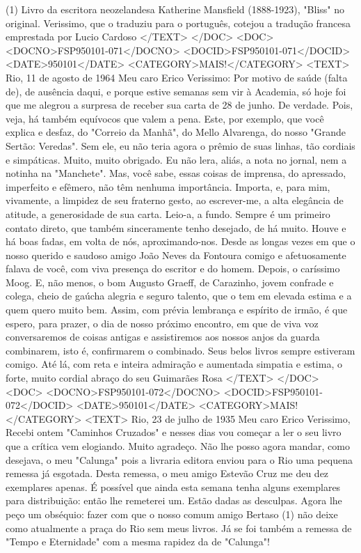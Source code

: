 (1) Livro da escritora neozelandesa Katherine Mansfield (1888-1923), "Bliss" no original. Verissimo, que o traduziu para o português, cotejou a tradução francesa emprestada por Lucio Cardoso
</TEXT>
</DOC>
<DOC>
<DOCNO>FSP950101-071</DOCNO>
<DOCID>FSP950101-071</DOCID>
<DATE>950101</DATE>
<CATEGORY>MAIS!</CATEGORY>
<TEXT>
Rio, 11 de agosto de 1964
Meu caro Erico Verissimo:
Por motivo de saúde (falta de), de ausência daqui, e porque estive semanas sem vir à Academia, só hoje foi que me alegrou a surpresa de receber sua carta de 28 de junho. De verdade. Pois, veja, há também equívocos que valem a pena. Este, por exemplo, que você explica e desfaz, do "Correio da Manhã", do Mello Alvarenga, do nosso "Grande Sertão: Veredas". Sem ele, eu não teria agora o prêmio de suas linhas, tão cordiais e simpáticas. Muito, muito obrigado.
Eu não lera, aliás, a nota no jornal, nem a notinha na "Manchete". Mas, você sabe, essas coisas de imprensa, do apressado, imperfeito e efêmero, não têm nenhuma importância. Importa, e, para mim, vivamente, a limpidez de seu fraterno gesto, ao escrever-me, a alta elegância de atitude, a generosidade de sua carta. Leio-a, a fundo.
Sempre é um primeiro contato direto, que também sinceramente tenho desejado, de há muito. Houve e há boas fadas, em volta de nós, aproximando-nos. Desde as longas vezes em que o nosso querido e saudoso amigo João Neves da Fontoura comigo e afetuosamente falava de você, com viva presença do escritor e do homem. Depois, o caríssimo Moog. E, não menos, o bom Augusto Graeff, de Carazinho, jovem confrade e colega, cheio de gaúcha alegria e seguro talento, que o tem em elevada estima e a quem quero muito bem.
Assim, com prévia lembrança e espírito de irmão, é que espero, para prazer, o dia de nosso próximo encontro, em que de viva voz conversaremos de coisas antigas e assistiremos aos nossos anjos da guarda combinarem, isto é, confirmarem o combinado. Seus belos livros sempre estiveram comigo.
Até lá, com reta e inteira admiração e aumentada simpatia e estima, o forte, muito cordial abraço do seu
Guimarães Rosa
</TEXT>
</DOC>
<DOC>
<DOCNO>FSP950101-072</DOCNO>
<DOCID>FSP950101-072</DOCID>
<DATE>950101</DATE>
<CATEGORY>MAIS!</CATEGORY>
<TEXT>
Rio, 23 de julho de 1935
Meu caro Erico Verissimo,
Recebi ontem "Caminhos Cruzados" e nesses dias vou começar a ler o seu livro que a crítica vem elogiando. Muito agradeço. Não lhe posso agora mandar, como desejava, o meu "Calunga" pois a livraria editora enviou para o Rio uma pequena remessa já esgotada. Desta remessa, o meu amigo Estevão Cruz me deu dez exemplares apenas. É possível que ainda esta semana tenha alguns exemplares para distribuição: então lhe remeterei um. Estão dadas as desculpas. Agora lhe peço um obséquio: fazer com que o nosso comum amigo Bertaso (1) não deixe como atualmente a praça do Rio sem meus livros. Já se foi também a remessa de "Tempo e Eternidade" com a mesma rapidez da de "Calunga"!
